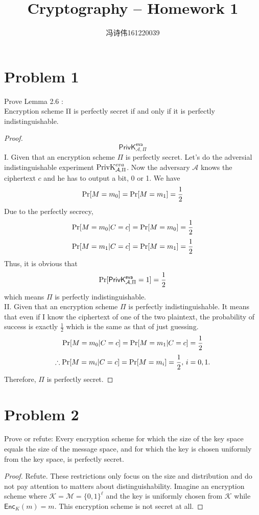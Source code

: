 \documentclass[a4papers]{ctexart}
\title{Cryptography -- Homework 1}
\author{冯诗伟161220039}
\date{}
\begin{document}
\maketitle
\section{Problem 1}
\noindent Prove Lemma 2.6 : \\ Encryption scheme Π is perfectly secret if and only if it is perfectly indistinguishable.
\begin{proof}
\[  \mathsf{PrivK}^{\mathsf{eva}}_{\mathcal{A},\Pi}  \]
I. Given that an encryption scheme $\Pi$ is perfectly secret. Let's do the adversial indistinguishable experiment ${\rm PrivK}^{eva}_{\mathcal{A},\Pi}$.
Now the adversary $\mathcal{A}$ knows the ciphertext $c$ and he has to output a bit, 0 or 1. We have
\[{\rm Pr}[M=m_0] ={\rm Pr}[M=m_1] = \dfrac{1}{2}\]
Due to the perfectly secrecy,
\[{\rm Pr}[M=m_0 | C=c] ={\rm Pr}[M=m_0] = \dfrac{1}{2}\]
\[{\rm Pr}[M=m_1 | C=c] ={\rm Pr}[M=m_1] = \dfrac{1}{2}\]
Thus, it is obvious that\[{\rm Pr}[\mathsf{PrivK}^{\mathsf{eva}}_{\mathcal{A},\Pi}=1] = \dfrac{1}{2} \]
which means $\Pi$ is perfectly indistinguishable.\\
II. Given that an encryption scheme $\Pi$ is perfectly indistinguishable. It means that even if I know the ciphertext of one of the two
plaintext, the probability of success is exactly $\frac{1}{2}$ which is the same as that of just guessing.
\[{\rm Pr}[M=m_0 | C=c] ={\rm Pr}[M=m_1 | C=c] = \dfrac{1}{2}\]
\[\therefore{\rm Pr}[M=m_i | C=c] ={\rm Pr}[M=m_i] = \dfrac{1}{2},\, i=0,1.\]
Therefore, $\Pi$ is perfectly secret.
\end{proof}

\section{Problem 2}
\noindent Prove or refute: Every encryption scheme for which the size of the key space equals the size of the message space, 
and for which the key is chosen uniformly from the key space, is perfectly secret.
\begin{proof}
    Refute. These restrictions only focus on the size and distribution and do not pay attention to matters about distinguishability.
Imagine an encryption scheme where $\mathcal{K}=\mathcal{M}= \{ 0,1\} ^{ \ell }$ and the key is uniformly chosen from $\mathcal{K}$ 
while $\mathsf{Enc}_{K}(m)=m$.
This encryption scheme is not secret at all.
\end{proof}
\end{document}
